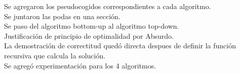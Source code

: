 Se agregaron los pseudocogidos correspondientes a cada algoritmo.\\
Se juntaron las podas en una sección.\\
Se paso del algoritmo bottom-up al algoritmo top-down.\\
Justificación de principio de optimalidad por Absurdo.\\
La demostración de correctitud quedó directa despues de definir la función recursiva que calcula la solución.\\
Se agregó experimentación para los 4 algoritmos.\\

